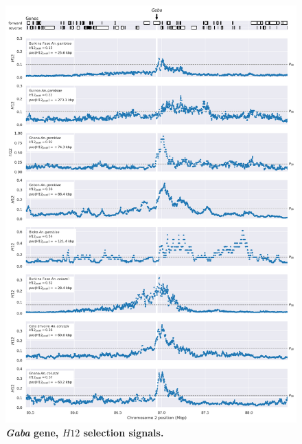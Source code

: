 \documentclass[a4paper,11pt,abstracton,hidelinks]{scrartcl}
\begin{document}
\begin{figure}[t!]
	\begin{center}
		\includegraphics*[width=1\linewidth,center]{artwork/locus_gaba_h12_pdist.png}
	\end{center}
	\caption[\textit{Gaba} gene, $H12$ selection signals]{
	\textbf{\textit{Gaba} gene, $H12$ selection signals.}
	} 
	\label{fig:locus_gaba_h12}
\end{figure}


\clearpage
\end{document}

